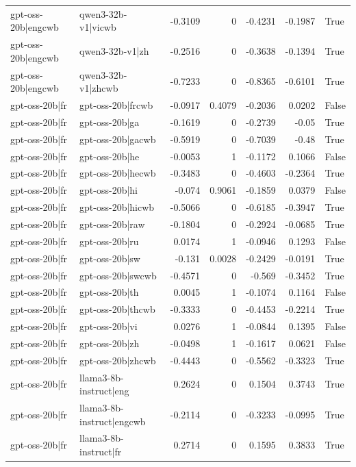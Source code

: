 \begin{table}
\begin{tabular}{l l r r r r l}
gpt-oss-20b|engcwb & qwen3-32b-v1|vicwb & -0.3109 & 0 & -0.4231 & -0.1987 & True \\
gpt-oss-20b|engcwb & qwen3-32b-v1|zh & -0.2516 & 0 & -0.3638 & -0.1394 & True \\
gpt-oss-20b|engcwb & qwen3-32b-v1|zhcwb & -0.7233 & 0 & -0.8365 & -0.6101 & True \\
gpt-oss-20b|fr & gpt-oss-20b|frcwb & -0.0917 & 0.4079 & -0.2036 & 0.0202 & False \\
gpt-oss-20b|fr & gpt-oss-20b|ga & -0.1619 & 0 & -0.2739 & -0.05 & True \\
gpt-oss-20b|fr & gpt-oss-20b|gacwb & -0.5919 & 0 & -0.7039 & -0.48 & True \\
gpt-oss-20b|fr & gpt-oss-20b|he & -0.0053 & 1 & -0.1172 & 0.1066 & False \\
gpt-oss-20b|fr & gpt-oss-20b|hecwb & -0.3483 & 0 & -0.4603 & -0.2364 & True \\
gpt-oss-20b|fr & gpt-oss-20b|hi & -0.074 & 0.9061 & -0.1859 & 0.0379 & False \\
gpt-oss-20b|fr & gpt-oss-20b|hicwb & -0.5066 & 0 & -0.6185 & -0.3947 & True \\
gpt-oss-20b|fr & gpt-oss-20b|raw & -0.1804 & 0 & -0.2924 & -0.0685 & True \\
gpt-oss-20b|fr & gpt-oss-20b|ru & 0.0174 & 1 & -0.0946 & 0.1293 & False \\
gpt-oss-20b|fr & gpt-oss-20b|sw & -0.131 & 0.0028 & -0.2429 & -0.0191 & True \\
gpt-oss-20b|fr & gpt-oss-20b|swcwb & -0.4571 & 0 & -0.569 & -0.3452 & True \\
gpt-oss-20b|fr & gpt-oss-20b|th & 0.0045 & 1 & -0.1074 & 0.1164 & False \\
gpt-oss-20b|fr & gpt-oss-20b|thcwb & -0.3333 & 0 & -0.4453 & -0.2214 & True \\
gpt-oss-20b|fr & gpt-oss-20b|vi & 0.0276 & 1 & -0.0844 & 0.1395 & False \\
gpt-oss-20b|fr & gpt-oss-20b|zh & -0.0498 & 1 & -0.1617 & 0.0621 & False \\
gpt-oss-20b|fr & gpt-oss-20b|zhcwb & -0.4443 & 0 & -0.5562 & -0.3323 & True \\
gpt-oss-20b|fr & llama3-8b-instruct|eng & 0.2624 & 0 & 0.1504 & 0.3743 & True \\
gpt-oss-20b|fr & llama3-8b-instruct|engcwb & -0.2114 & 0 & -0.3233 & -0.0995 & True \\
gpt-oss-20b|fr & llama3-8b-instruct|fr & 0.2714 & 0 & 0.1595 & 0.3833 & True \\

\end{tabular}
\end{table}
